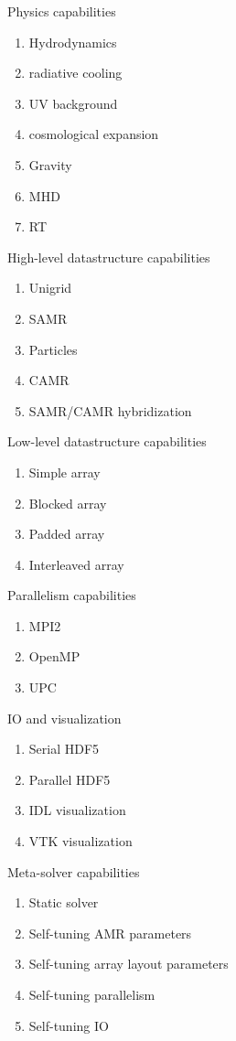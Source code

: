 \documentclass{article}[12pt]
\begin{document}
Physics capabilities

\begin{enumerate}
\item Hydrodynamics
\item radiative cooling
\item UV background
\item cosmological expansion
\item Gravity
\item MHD
\item RT
\end{enumerate}

High-level datastructure capabilities

\begin{enumerate}
\item Unigrid
\item SAMR
\item Particles
\item CAMR
\item SAMR/CAMR hybridization
\end{enumerate}

Low-level  datastructure capabilities

\begin{enumerate}
\item Simple array
\item Blocked array
\item Padded array
\item Interleaved array
\end{enumerate}

Parallelism capabilities

\begin{enumerate}
\item MPI2
\item OpenMP
\item UPC
\end{enumerate}

IO and visualization

\begin{enumerate}
\item Serial HDF5
\item Parallel HDF5
\item IDL visualization
\item VTK visualization
\end{enumerate}

Meta-solver capabilities

\begin{enumerate}
\item Static solver
\item Self-tuning AMR parameters
\item Self-tuning array layout parameters
\item Self-tuning parallelism
\item Self-tuning IO
\end{enumerate}
\end{document}
